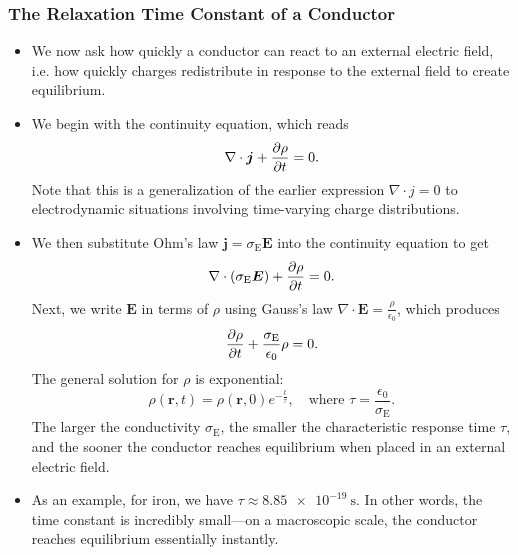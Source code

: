 \documentclass[11pt, a4paper]{article}
\renewcommand{\vec}[1]{\bm{#1}} %
\renewcommand{\r}{\vec{r}}
\newcommand{\E}{\vec{E}} %
\newcommand{\ee}{\epsilon_{0}}  %
\renewcommand{\j}{\vec{j}}  %
\renewcommand{\div}{\nabla \cdot}
\begin{document}
\subsubsection{The Relaxation Time Constant of a Conductor}
\begin{itemize}
	\item We now ask how quickly a conductor can react to an external electric field, i.e. how quickly charges redistribute in response to the external field to create equilibrium. 
	
	\item We begin with the continuity equation, which reads
	\begin{equation*}
		\div \j + \pdv{\rho}{t} = 0.
	\end{equation*}
	Note that this is a generalization of the earlier expression $ \div j = 0 $ to electrodynamic situations involving time-varying charge distributions. 
	
	\item We then substitute Ohm's law $ \j = \sigma_{\mathrm{E}}\E $ into the continuity equation to get
	\begin{equation*}
		\div (\sigma_{\mathrm{E}} \E) + \pdv{\rho}{t} = 0.
	\end{equation*}
	Next, we write $ \E $ in terms of $ \rho $ using Gauss's law $ \div \E = \frac{\rho}{\ee} $, which produces
	\begin{equation*}
		\pdv{\rho}{t} + \frac{\sigma_{\mathrm{E}}}{\ee} \rho = 0.
	\end{equation*}
	The general solution for $ \rho $ is exponential:
	\begin{equation*}
        \rho(\r, t) = \rho(\r, 0)e^{-\frac{t}{\tau}}, \quad \text{where } \tau = \frac{\ee}{\sigma_{\text{E}}}.
	\end{equation*}
	The larger the conductivity $ \sigma_{\mathrm{E}} $, the smaller the characteristic response time $ \tau $, and the sooner the conductor reaches equilibrium when placed in an external electric field. 
	
	\item As an example, for iron, we have $ \tau \approx \SI{8.85e-19}{\second} $. In other words, the time constant is incredibly small---on a macroscopic scale, the conductor reaches equilibrium essentially instantly.
	
\end{itemize}
\end{document}
